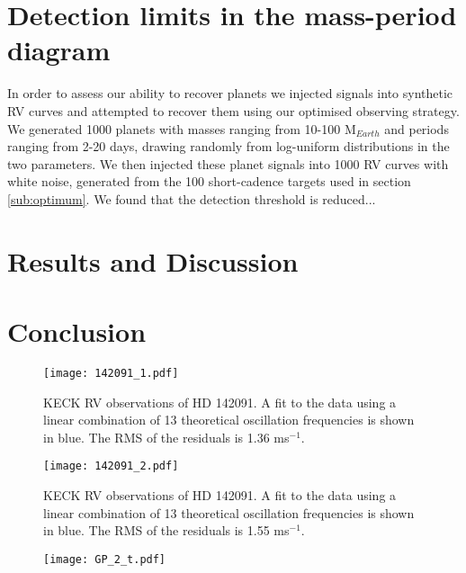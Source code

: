 \documentclass[useAMS, usenatbib]{aastex}
\begin{document}
\section{Detection limits in the mass-period diagram}

In order to assess our ability to recover planets we injected signals into
synthetic RV curves and attempted to recover them using our optimised observing
strategy.
We generated 1000 planets with masses ranging from 10-100 M$_{Earth}$ and
periods ranging from 2-20 days, drawing randomly from log-uniform
distributions in the two parameters.
We then injected these planet signals into 1000 RV curves with white noise,
generated from the 100 short-cadence targets used in section \ref{sub:optimum}.
We found that the detection threshold is reduced...

\section{Results and Discussion}
\label{results}

\section{Conclusion}
\label{conclusion}

\begin{figure*}
\begin{center}
\texttt{[image: 142091\_1.pdf]}
\caption{KECK RV observations of HD 142091. A fit to the data using a linear
combination of 13 theoretical oscillation frequencies is shown in blue. The RMS
of the residuals is 1.36 ms$^{-1}$.}
\label{fig:k2_1}
\end{center}
\end{figure*}

\begin{figure*}
\begin{center}
\texttt{[image: 142091\_2.pdf]}
\caption{KECK RV observations of HD 142091. A fit to the data using a linear
combination of 13 theoretical oscillation frequencies is shown in blue. The RMS
of the residuals is 1.55 ms$^{-1}$.}
\label{fig:k2_2}
\end{center}
\end{figure*}

\begin{figure*}
\begin{center}
\texttt{[image: GP\_2\_t.pdf]}
\caption{
}
\label{fig:obs}
\end{center}
\end{figure*}



\end{document}
